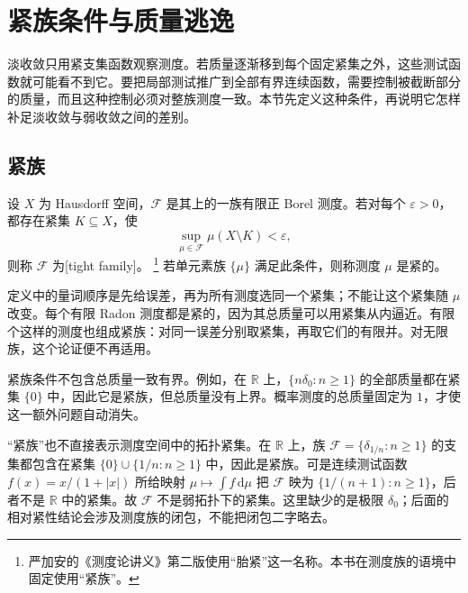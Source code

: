 \section{紧族条件与质量逃逸}
\label{b1:sec:1203}

淡收敛只用紧支集函数观察测度。若质量逐渐移到每个固定紧集之外，这些测试函数就可能看不到它。要把局部测试推广到全部有界连续函数，需要控制被截断部分的质量，而且这种控制必须对整族测度一致。本节先定义这种条件，再说明它怎样补足淡收敛与弱收敛之间的差别。

\subsection{紧族}
\label{b1:subsec:120301}

\begin{definition}\label{b1:def:tight-family}
设 \(X\) 为 Hausdorff 空间，\(\mathcal F\) 是其上的一族有限正 Borel 测度。若对每个 \(\varepsilon>0\)，都存在紧集 \(K\subseteq X\)，使
\[
 \sup_{\mu\in\mathcal F}\mu(X\setminus K)<\varepsilon,
\]
则称 \(\mathcal F\) 为[tight family]。%
\footnote{严加安的《测度论讲义》第二版\cite[第6.3节]{Yan2004Cedulun}使用“胎紧”这一名称。本书在测度族的语境中固定使用“紧族”。}
若单元素族 \(\{\mu\}\) 满足此条件，则称测度 \(\mu\) 是紧的。
\end{definition}

定义中的量词顺序是先给误差，再为所有测度选同一个紧集；不能让这个紧集随 \(\mu\) 改变。每个有限 Radon 测度都是紧的，因为其总质量可以用紧集从内逼近。有限个这样的测度也组成紧族：对同一误差分别取紧集，再取它们的有限并。对无限族，这个论证便不再适用。

\ProseParagraphBreak

紧族条件不包含总质量一致有界。例如，在 \(\mathbb R\) 上，\(\{n\delta_0:n\geq1\}\) 的全部质量都在紧集 \(\{0\}\) 中，因此它是紧族，但总质量没有上界。概率测度的总质量固定为 \(1\)，才使这一额外问题自动消失。

\ProseParagraphBreak

“紧族”也不直接表示测度空间中的拓扑紧集。在 \(\mathbb R\) 上，族 \(\mathcal F=\{\delta_{1/n}:n\geq1\}\) 的支集都包含在紧集 \(\{0\}\cup\{1/n:n\geq1\}\) 中，因此是紧族。可是连续测试函数 \(f(x)=x/(1+|x|)\) 所给映射 \(\mu\mapsto\int f\,\mathrm d\mu\) 把 \(\mathcal F\) 映为 \(\{1/(n+1):n\geq1\}\)，后者不是 \(\mathbb R\) 中的紧集。故 \(\mathcal F\) 不是弱拓扑下的紧集。这里缺少的是极限 \(\delta_0\)；后面的相对紧性结论会涉及测度族的闭包，不能把闭包二字略去。

